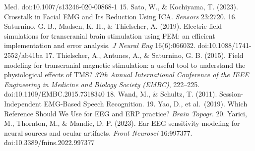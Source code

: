 \documentclass[
  11pt,
  a4paper,
]{article}
\begin{document}
\begin{enumerate}
{  Med}. doi:10.1007/s13246-020-00868-1 15. Sato, W., \& Kochiyama, T. (2023).
  Crosstalk in Facial EMG and Its Reduction Using ICA. \emph{Sensors} 23:2720. 16.
  Saturnino, G. B., Madsen, K. H., \& Thielscher, A. (2019). Electric field
  simulations for transcranial brain stimulation using FEM: an efficient
  implementation and error analysis. \emph{J Neural Eng} 16(6):066032.
  doi:10.1088/1741-2552/ab41ba 17. Thielscher, A., Antunes, A., \& Saturnino, G. B.
  (2015). Field modeling for transcranial magnetic stimulation: a useful tool to
  understand the physiological effects of TMS? \emph{37th Annual International
  Conference of the IEEE Engineering in Medicine and Biology Society (EMBC)},
  222--225. doi:10.1109/EMBC.2015.7318340 18. Wand, M., \& Schultz, T. (2011).
  Session-Independent EMG-Based Speech Recognition. 19. Yao, D., et al.~(2019).
  Which Reference Should We Use for EEG and ERP practice? \emph{Brain Topogr}. 20.
  Yarici, M., Thornton, M., \& Mandic, D. P. (2023). Ear-EEG sensitivity modeling
  for neural sources and ocular artifacts. \emph{Front Neurosci} 16:997377.
  doi:10.3389/fnins.2022.997377
\end{enumerate}
\end{document}
